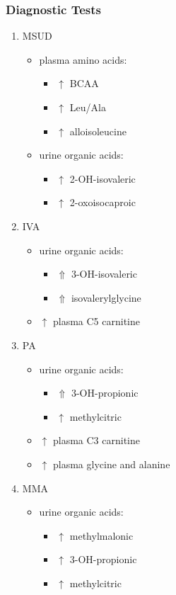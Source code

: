 \documentclass{scrartcl}
\begin{document}
\subsubsection{Diagnostic Tests}
\label{sec:org8fcf567}
\begin{enumerate}
\item MSUD
\label{sec:orge911990}
\begin{itemize}
\item plasma amino acids:
\begin{itemize}
\item \(\uparrow\) BCAA
\item \(\uparrow\) Leu/Ala
\item \(\uparrow\) alloisoleucine
\end{itemize}
\item urine organic acids:
\begin{itemize}
\item \(\uparrow\) 2-OH-isovaleric
\item \(\uparrow\) 2-oxoisocaproic
\end{itemize}
\end{itemize}

\item IVA
\label{sec:org4eb40f1}
\begin{itemize}
\item urine organic acids:
\begin{itemize}
\item \(\Uparrow\) 3-OH-isovaleric
\item \(\Uparrow\) isovalerylglycine
\end{itemize}
\item \(\uparrow\) plasma C5 carnitine
\end{itemize}

\item PA
\label{sec:orgc557b83}
\begin{itemize}
\item urine organic acids:
\begin{itemize}
\item \(\Uparrow\) 3-OH-propionic
\item \(\uparrow\) methylcitric
\end{itemize}
\item \(\uparrow\) plasma C3 carnitine
\item \(\uparrow\) plasma glycine and alanine
\end{itemize}

\item MMA
\label{sec:org2faf1db}
\begin{itemize}
\item urine organic acids:
\begin{itemize}
\item \(\uparrow\) methylmalonic
\item \(\uparrow\) 3-OH-propionic
\item \(\uparrow\) methylcitric
\end{itemize}


\end{itemize}
\end{enumerate}
\end{document}
